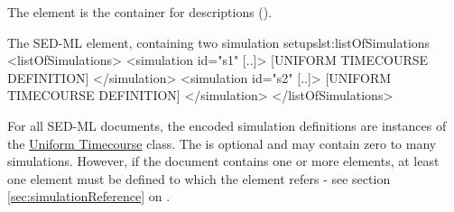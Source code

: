 \label{sec:listOfSimulations}

The  element is the container for  descriptions ().
%
%

%
\begin{myXmlLst}{The SED-ML  element, containing two simulation setups}{lst:listOfSimulations}
 <listOfSimulations>
  <simulation id="s1" [..]>
   [UNIFORM TIMECOURSE DEFINITION]
  </simulation>
  <simulation id="s2" [..]>
   [UNIFORM TIMECOURSE DEFINITION]
  </simulation>
 </listOfSimulations>
\end{myXmlLst}
%
For all SED-ML \LoneVone documents, the encoded simulation definitions are instances of the \hyperref[class:timeCourse]{Uniform Timecourse} class.  The  is optional and may contain zero to many simulations. However, if the \LoneVone document contains  one or more     elements,  at least one   element must be defined to which  the    element refers - see  section \ref{sec:simulationReference} on .


